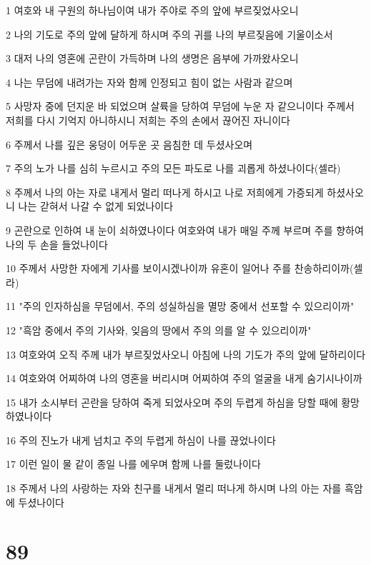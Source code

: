 \par 1 여호와 내 구원의 하나님이여 내가 주야로 주의 앞에 부르짖었사오니
\par 2 나의 기도로 주의 앞에 달하게 하시며 주의 귀를 나의 부르짖음에 기울이소서
\par 3 대저 나의 영혼에 곤란이 가득하며 나의 생명은 음부에 가까왔사오니
\par 4 나는 무덤에 내려가는 자와 함께 인정되고 힘이 없는 사람과 같으며
\par 5 사망자 중에 던지운 바 되었으며 살륙을 당하여 무덤에 누운 자 같으니이다 주께서 저희를 다시 기억지 아니하시니 저희는 주의 손에서 끊어진 자니이다
\par 6 주께서 나를 깊은 웅덩이 어두운 곳 음침한 데 두셨사오며
\par 7 주의 노가 나를 심히 누르시고 주의 모든 파도로 나를 괴롭게 하셨나이다(셀라)
\par 8 주께서 나의 아는 자로 내게서 멀리 떠나게 하시고 나로 저희에게 가증되게 하셨사오니 나는 갇혀서 나갈 수 없게 되었나이다
\par 9 곤란으로 인하여 내 눈이 쇠하였나이다 여호와여 내가 매일 주께 부르며 주를 향하여 나의 두 손을 들었나이다
\par 10 주께서 사망한 자에게 기사를 보이시겠나이까 유혼이 일어나 주를 찬송하리이까(셀라)
\par 11 "주의 인자하심을 무덤에서, 주의 성실하심을 멸망 중에서 선포할 수 있으리이까"
\par 12 "흑암 중에서 주의 기사와, 잊음의 땅에서 주의 의를 알 수 있으리이까"
\par 13 여호와여 오직 주께 내가 부르짖었사오니 아침에 나의 기도가 주의 앞에 달하리이다
\par 14 여호와여 어찌하여 나의 영혼을 버리시며 어찌하여 주의 얼굴을 내게 숨기시나이까
\par 15 내가 소시부터 곤란을 당하여 죽게 되었사오며 주의 두렵게 하심을 당할 때에 황망하였나이다
\par 16 주의 진노가 내게 넘치고 주의 두렵게 하심이 나를 끊었나이다
\par 17 이런 일이 물 같이 종일 나를 에우며 함께 나를 둘렀나이다
\par 18 주께서 나의 사랑하는 자와 친구를 내게서 멀리 떠나게 하시며 나의 아는 자를 흑암에 두셨나이다

\chapter{89}

